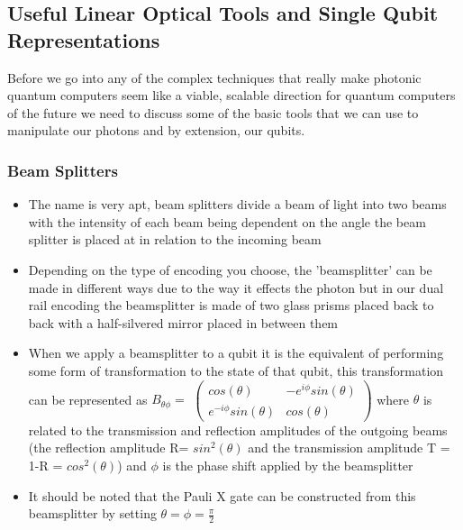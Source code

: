 
\subsection{Useful Linear Optical Tools and Single Qubit Representations}
Before we go into any of the complex techniques that really make photonic quantum computers seem like a viable, scalable direction for quantum computers of the future we need to discuss some of the basic tools that we can use to manipulate our photons and by extension, our qubits.
\subsubsection{Beam Splitters}
\begin{itemize}
    \item The name is very apt, beam splitters divide a beam of light into two beams with the intensity of each beam being dependent on the angle the beam splitter is placed at in relation to the incoming beam
    \item Depending on the type of encoding you choose, the 'beamsplitter' can be made in different ways due to the way it effects the photon but in our dual rail encoding the beamsplitter is made of two glass prisms placed back to back with a half-silvered mirror placed in between them %
    \item When we apply a beamsplitter to a qubit it is the equivalent of performing some form of transformation to the state of that qubit, this transformation can be represented as $B_{\theta\phi} = $ $\begin{pmatrix}
    cos(\theta) & -e^{i\phi}sin(\theta) \\
    e^{-i\phi}sin(\theta) & cos(\theta) 
    \end{pmatrix}$ where $\theta$ is related to the transmission and reflection amplitudes of the outgoing beams (the reflection amplitude R= $sin^2(\theta)$ and the transmission amplitude T = 1-R = $cos^2(\theta)$) and $\phi$ is the phase shift applied by the beamsplitter
    \item It should be noted that the Pauli X gate can be constructed from this beamsplitter by setting $\theta = \phi = \frac{\pi}{2}$
    
\end{itemize}
